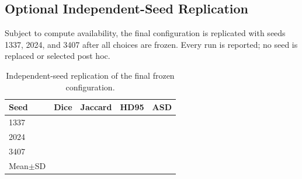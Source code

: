\subsection{Optional Independent-Seed Replication}
Subject to compute availability, the final configuration is replicated with seeds 1337, 2024, and 3407 after all choices are frozen. Every run is reported; no seed is replaced or selected post hoc.

\begin{table}[t]
\centering
\caption{Independent-seed replication of the final frozen configuration.}
\label{tab:seeds}
\begin{tabular}{lcccc}
\toprule
Seed & Dice & Jaccard & HD95 & ASD \\
\midrule
1337 & \todoresult{} & \todoresult{} & \todoresult{} & \todoresult{} \\
2024 & \todoresult{} & \todoresult{} & \todoresult{} & \todoresult{} \\
3407 & \todoresult{} & \todoresult{} & \todoresult{} & \todoresult{} \\
\midrule
Mean$\pm$SD & \todoresult{} & \todoresult{} & \todoresult{} & \todoresult{} \\
\bottomrule
\end{tabular}
\end{table}
